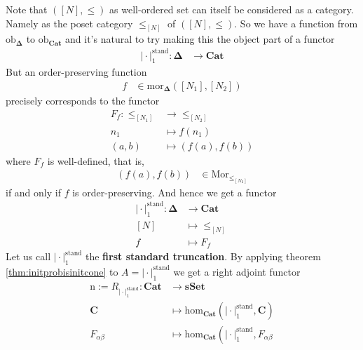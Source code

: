 \begin{cst}[Nerve]
\label{cst:nerve}
Note that $([N],\leq)$ as well-ordered set can itself be considered as a category. Namely as the poset category $\pmb{\leq}_{[N]}$ of $([N],\leq)$. So we have a function from $\mathrm{ob}_{\mathbf{\Delta}}$ to $\mathrm{ob}_{\mathbf{Cat}}$ and it's natural to try making this the object part of a functor
\begin{align*}
  \vert
    \cdot
  \vert_{1}^{\textrm{stand}}
  \colon
  \mathbf{\Delta}
  &\rightarrow
  \mathbf{Cat}
\end{align*}
But an order-preserving function
\begin{align*}
  f
  &\in
  \mathrm{mor}_{\mathbf{\Delta}}
  \left(
    [N_{1}],
    [N_{2}]
  \right)
\end{align*}
precisely corresponds to the functor
\begin{align*}
  F_{f}
  \colon
  \pmb{\leq}_{[N_{1}]}
  &\rightarrow
  \pmb{\leq}_{[N_{2}]}
  \\
  n_{1}
  &\mapsto
  f(n_{1})
  \\
  (a,b)
  &\mapsto
  (f(a),f(b))
\end{align*}
where $F_{f}$ is well-defined, that is,
\begin{align*}
  (f(a),f(b))
  &\in
  \mathrm{Mor}_{\pmb{\leq}_{[N_{2}]}}
\end{align*}
if and only if $f$ is order-preserving. And hence we get a functor
\begin{align*}
  \vert
    \cdot
  \vert_{1}^{\textrm{stand}}
  \colon
  \mathbf{\Delta}
  &\rightarrow
  \mathbf{Cat}
  \\
  [N]
  &\mapsto
  \pmb{\leq}_{[N]}
  \\
  f
  &\mapsto
  F_{f}
\end{align*}
Let us call $\vert \cdot \vert_{1}^{\textrm{stand}}$ the \textbf{first standard truncation}. By applying theorem \ref{thm:initprobisinitcone} to $A = \vert \cdot \vert_{1}^{\textrm{stand}}$ we get a right adjoint functor
\begin{align*}
  \mathrm{n}
  :=
  R_{\vert \cdot \vert_{1}^{\textrm{stand}}}
  \colon
  \mathbf{Cat}
  &\rightarrow
  \mathbf{sSet}
  \\
  \mathbf{C}
  &\mapsto
  \mathrm{hom}_{\mathbf{Cat}}
  \left(
    \vert
      \cdot
    \vert_{1}^{\textrm{stand}},
    \mathbf{C}
  \right)
  \\
  F_{\alpha\beta}
  &\mapsto
  \mathrm{hom}_{\mathbf{Cat}}
  \left(
    \vert
      \cdot
    \vert_{1}^{\textrm{stand}},
    F_{\alpha\beta}

\end{align*}
\end{cst}
